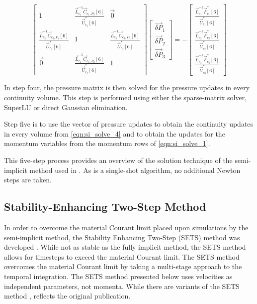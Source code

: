   \begin{equation}
 \label{eqn:si_pressure_matrix}
 \begin{bmatrix} 
 1 & \frac{\vec{L}^{-1}_{c_1}\vec{C}_{c_1,P_2}[6]}{\vec{U}^{*}_{c_1}[6]} & \vec{0} \\
 \frac{\vec{L}^{-1}_{c_2}\vec{C}_{c_2,P_1}[6]}{\vec{U}^{*}_{c_2}[6]} & 1 & \frac{\vec{L}^{-1}_{c_2}\vec{C}_{c_2,P_3}[6]}{\vec{U}^{*}_{c_2}[6]} \\
 \vec{0}           & \frac{\vec{L}^{-1}_{c_3}\vec{C}_{c_3,P_2}[6]}{\vec{U}^{*}_{c_3}[6]} & 1
 \end{bmatrix} \begin{bmatrix}
 \vec{\delta P}_{1} \\
 \vec{\delta P}_{2} \\
 \vec{\delta P}_{3}
\end{bmatrix}  = -\begin{bmatrix}
 \frac{\vec{L}^{-1}_{c_1}\vec{F}^{*}_{c_1}[6]}{\vec{U}^{*}_{c_1}[6]} \\
 \frac{\vec{L}^{-1}_{c_2}\vec{F}^{*}_{c_2}[6]}{\vec{U}^{*}_{c_2}[6]} \\
 \frac{\vec{L}^{-1}_{c_3}\vec{F}^{*}_{c_3}[6]}{\vec{U}^{*}_{c_3}[6]}
\end{bmatrix}
 \end{equation}

In step four, the pressure matrix is then solved for the pressure updates in every continuity volume.
This step is performed using either the sparse-matrix solver, SuperLU \cite{Li1999} or direct Gaussian elimination. 

Step five is to use the vector of pressure updates to obtain the continuity updates in every volume from \eqref{eqn:si_solve_4} and to obtain the updates for the momentum variables from the momentum rows of \eqref{eqn:si_solve_1}.

This five-step process provides an overview of the solution technique of the semi-implicit method used in \cobra{}.
As \cobra{} is a single-shot algorithm, no additional Newton steps are taken.

\subsection{Stability-Enhancing Two-Step Method} 
\label{subsect:numerics_sets}
In order to overcome the material Courant limit placed upon simulations by the semi-implicit method, the Stability Enhancing Two-Step (SETS) method was developed \cite{Mahaffy1982}.
While not as stable as the fully implicit method, the SETS method allows for timesteps to exceed the material Courant limit.
The SETS method overcomes the material Courant limit by taking a multi-stage approach to the temporal integration.
The SETS method presented below uses velocities as independent parameters, not momenta.
While there are variants of the SETS method \cite{TRACE},  reflects the original publication.

